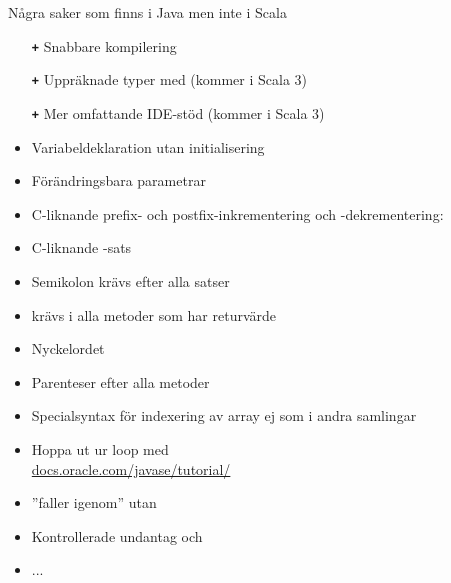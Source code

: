 \begin{Slide}{Några saker som finns i Java men inte i Scala}
\ifkompendium\else
\vspace{-0.7em}\begin{multicols}{2}\SlideFontTiny
\fi
\begin{itemize}
\item[\textbf{\texttt{+}}] Snabbare kompilering

\item[\textbf{\texttt{+}}] Uppräknade typer med {\texttt{\bfseries{\color{eclipsepurple}{enum}}}} (kommer i Scala 3)

\item[\textbf{\texttt{+}}] Mer omfattande IDE-stöd (kommer i Scala 3)

\item Variabeldeklaration utan initialisering

\item Förändringsbara parametrar

\item C-liknande prefix- och postfix-inkrementering och -dekrementering: 

\item C-liknande -sats

\item Semikolon krävs efter alla satser

\item {} krävs i alla metoder som har returvärde

\item Nyckelordet 

\item Parenteser efter alla metoder

\item Specialsyntax för indexering av array \code{[]} ej som i andra samlingar

\item Hoppa ut ur loop med  \\ \href{https://docs.oracle.com/javase/tutorial/java/nutsandbolts/branch.html}{docs.oracle.com/javase/tutorial/}

\item {} ''faller igenom'' utan 

\item Kontrollerade undantag  och 

\item ...
\end{itemize}
\ifkompendium\else
\end{multicols}
\fi
\end{Slide}


